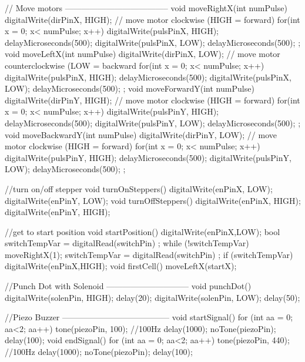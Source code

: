 // Move motors --------------------------------------
void moveRightX(int numPulse){
  digitalWrite(dirPinX, HIGH); 	// move motor clockwise (HIGH = forward)
  for(int x = 0; x< numPulse; x++){
    digitalWrite(pulsPinX, HIGH);
    delayMicroseconds(500);
    digitalWrite(pulsPinX, LOW);
    delayMicroseconds(500);
  } 
};
void moveLeftX(int numPulse){
  digitalWrite(dirPinX, LOW); 	// move motor counterclockwise (LOW = backward
  for(int x = 0; x< numPulse; x++){
    digitalWrite(pulsPinX, HIGH);
    delayMicroseconds(500);
    digitalWrite(pulsPinX, LOW);
    delayMicroseconds(500);
  }
};
void moveForwardY(int numPulse){
  digitalWrite(dirPinY, HIGH); 	// move motor clockwise (HIGH = forward)
  for(int x = 0; x< numPulse; x++){
    digitalWrite(pulsPinY, HIGH);
    delayMicroseconds(500);
    digitalWrite(pulsPinY, LOW);
    delayMicroseconds(500);
  }  
};
void moveBackwardY(int numPulse){
  digitalWrite(dirPinY, LOW); 	// move motor clockwise (HIGH = forward)
  for(int x = 0; x< numPulse; x++){
    digitalWrite(pulsPinY, HIGH);
    delayMicroseconds(500);
    digitalWrite(pulsPinY, LOW);
    delayMicroseconds(500);
  }
};

//turn on/off stepper
void turnOnSteppers(){
  digitalWrite(enPinX, LOW);
  digitalWrite(enPinY, LOW);
}
void turnOffSteppers(){
  digitalWrite(enPinX, HIGH);
  digitalWrite(enPinY, HIGH);
}

//get to start position
void startPosition(){
  digitalWrite(enPinX,LOW);
  bool switchTempVar = digitalRead(switchPin) ; 
  while (!switchTempVar)
  {
    moveRightX(1); 
    switchTempVar = digitalRead(switchPin) ; 
    if (switchTempVar){
      digitalWrite(enPinX,HIGH); 
    }
  }
}
void firstCell()
{
  moveLeftX(startX);
}

//Punch Dot with Solenoid ------------------------------
void punchDot(){
  digitalWrite(solenPin, HIGH);       
  delay(20);
  digitalWrite(solenPin, LOW);
  delay(50);
}

//Piezo Buzzer ---------------------------------------
 void startSignal(){
  for (int aa = 0; aa<2; aa++){
    tone(piezoPin, 100); //100Hz 
    delay(1000);
    noTone(piezoPin); 
    delay(100);
  }
 }
 void endSignal(){
  for (int aa = 0; aa<2; aa++){
    tone(piezoPin, 440); //100Hz 
    delay(1000);
    noTone(piezoPin);
    delay(100);
  }
 }

